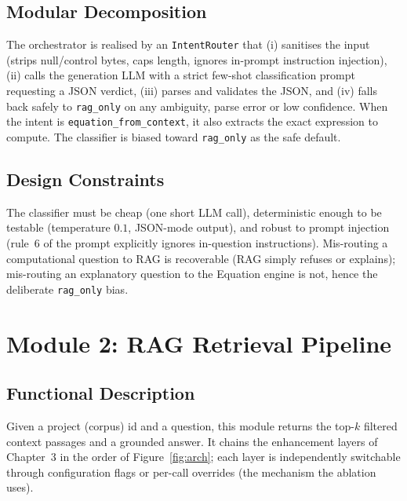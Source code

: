 \documentclass[12pt,a4paper]{report}
\begin{document}
\subsection{Modular Decomposition}
The orchestrator is realised by an \texttt{IntentRouter} that (i) sanitises the
input (strips null/control bytes, caps length, ignores in-prompt instruction
injection), (ii) calls the generation LLM with a strict few-shot classification
prompt requesting a JSON verdict, (iii) parses and validates the JSON, and (iv)
falls back safely to \texttt{rag\_only} on any ambiguity, parse error or low
confidence. When the intent is \texttt{equation\_from\_context}, it also extracts
the exact expression to compute. The classifier is biased toward
\texttt{rag\_only} as the safe default.

\subsection{Design Constraints}
The classifier must be cheap (one short LLM call), deterministic enough to be
testable (temperature $0.1$, JSON-mode output), and robust to prompt injection
(rule~6 of the prompt explicitly ignores in-question instructions). Mis-routing a
computational question to RAG is recoverable (RAG simply refuses or explains);
mis-routing an explanatory question to the Equation engine is not, hence the
deliberate \texttt{rag\_only} bias.

\section{Module 2: RAG Retrieval Pipeline}
\subsection{Functional Description}
Given a project (corpus) id and a question, this module returns the top-$k$
filtered context passages and a grounded answer. It chains the enhancement layers
of Chapter~3 in the order of Figure~\ref{fig:arch}; each layer is independently
switchable through configuration flags or per-call overrides (the mechanism the
ablation uses).
\end{document}
